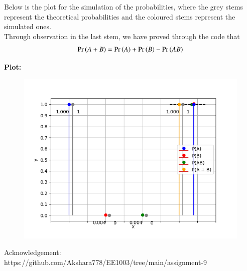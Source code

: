 \documentclass[journal]{IEEEtran}
\begin{document}
\pagebreak
Below is the plot for the simulation of the probabilities, where the grey stems represent the theoretical probabilities and the coloured stems represent the simulated ones.\\
Through observation in the last stem, we have proved through the code that
\begin{align}
	\Pr\left(A + B\right) = \Pr\left(A\right) + \Pr\left(B\right) - \Pr\left(AB\right)
\end{align}

\textbf{Plot:}\\
\begin{figure}[h]
   \centering
   \includegraphics[width=\columnwidth]{figs/figure1.png}
\end{figure}

Acknowledgement:
https://github.com/Akshara778/EE1003/tree/main/assignment-9
\end{document}

